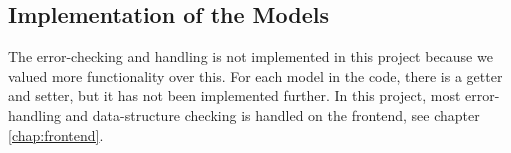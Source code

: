 \subsection{Implementation of the Models}\label{subsec:implementationmodels}
The error-checking and handling is not implemented in this project because we valued more functionality over this. For each model in the code, there is a getter and setter, but it has not been implemented further. In this project, most error-handling and data-structure checking is handled on the frontend, see chapter \ref{chap:frontend}.